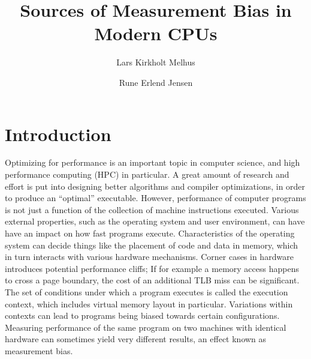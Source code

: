 \documentclass[a4paper,10pt,twocolumn,twoside]{article}
\author{Lars Kirkholt Melhus}
\author{Rune Erlend Jensen}
\affil{Norwegian University of Science and Technology}
\title{Sources of Measurement Bias in Modern CPUs}
\date{} %
\begin{document}


\section{Introduction}
Optimizing for performance is an important topic in computer science, and high performance computing (HPC) in particular. 
A great amount of research and effort is put into designing better algorithms and compiler optimizations, in order to produce an “optimal” executable. 
However, performance of computer programs is not just a function of the collection of machine instructions executed. 
Various external properties, such as the operating system and user environment, can have have an impact on how fast programs execute. 
Characteristics of the operating system can decide things like the placement of code and data in memory, which in turn interacts with various hardware mechanisms. 
Corner cases in hardware introduces potential performance cliffs; If for example a memory access happens to cross a page boundary, the cost of an additional TLB miss can be significant. 
The set of conditions under which a program executes is called the execution context, which includes virtual memory layout in particular. 
Variations within contexts can lead to programs being biased towards certain configurations. 
Measuring performance of the same program on two machines with identical hardware can sometimes yield very different results, an effect known as measurement bias.
\end{document}
